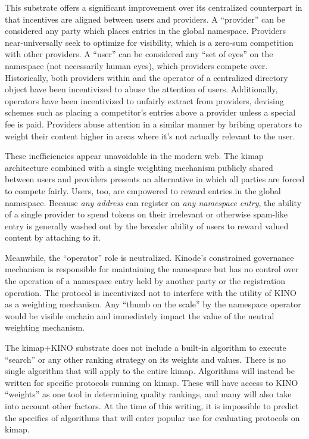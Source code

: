 \documentclass[runningheads]{llncs}
\begin{document}
This substrate offers a significant improvement over its centralized counterpart in that incentives are aligned between users and providers.
A ``provider'' can be considered any party which places entries in the global namespace.
Providers near-universally seek to optimize for visibility, which is a zero-sum competition with other providers.
A ``user'' can be considered any ``set of eyes'' on the namespace (not necessarily human eyes), which providers compete over.
Historically, both providers within and the operator of a centralized directory object have been incentivized to abuse the attention of users.
Additionally, operators have been incentivized to unfairly extract from providers, devising schemes such as placing a competitor's entries above a provider unless a special fee is paid.
Providers abuse attention in a similar manner by bribing operators to weight their content higher in areas where it's not actually relevant to the user.

These inefficiencies appear unavoidable in the modern web.
The kimap architecture combined with a single weighting mechanism publicly shared between users and providers presents an alternative in which all parties are forced to compete fairly.
Users, too, are empowered to reward entries in the global namespace.
Because \textit{any address} can register on \textit{any namespace entry}, the ability of a single provider to spend tokens on their irrelevant or otherwise spam-like entry is generally washed out by the broader ability of users to reward valued content by attaching to it.

Meanwhile, the ``operator'' role is neutralized.
Kinode's constrained governance mechanism is responsible for maintaining the namespace but has no control over the operation of a namespace entry held by another party or the registration operation.
The protocol is incentivized not to interfere with the utility of KINO as a weighting mechanism.
Any ``thumb on the scale'' by the namespace operator would be visible onchain and immediately impact the value of the neutral weighting mechanism.

The kimap+KINO substrate does not include a built-in algorithm to execute ``search'' or any other ranking strategy on its weights and values.
There is no single algorithm that will apply to the entire kimap.
Algorithms will instead be written for specific protocols running on kimap.
These will have access to KINO ``weights'' as one tool in determining quality rankings, and many will also take into account other factors.
At the time of this writing, it is impossible to predict the specifics of algorithms that will enter popular use for evaluating protocols on kimap.
\end{document}

